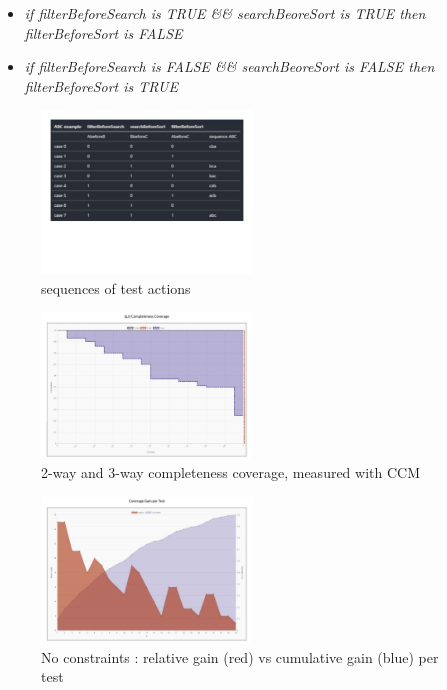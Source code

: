 \documentclass[conference]{IEEEtran}
\begin{document}
	\begin{itemize}
	\item [] \textit{if filterBeforeSearch is TRUE \&\& searchBeoreSort is TRUE then filterBeforeSort is FALSE}
	\item [] \textit{if filterBeforeSearch is FALSE \&\& searchBeoreSort is FALSE then filterBeforeSort is TRUE}
	\end{itemize}

	\begin{figure}[!t]
		\includegraphics[width=0.50\textwidth,]{sorting.pdf}
		\caption{sequences of test actions}
		\label{fig:sorting}
	\end{figure}

	\begin{figure}[!h]
		\includegraphics[width=0.50\textwidth,]{CompletenessCoverage.pdf}
		\caption{2-way and 3-way completeness coverage, measured with CCM}
		\label{fig:CompletenessCoverage}
	\end{figure}

	\begin{figure}[!h]
		\includegraphics[width=0.50\textwidth,]{coverageGainPerTest.pdf}
		\caption{No constraints : relative gain (red) vs cumulative gain (blue) per test}
		\label{fig:coverageGainPerTest}
	\end{figure}
\end{document}
